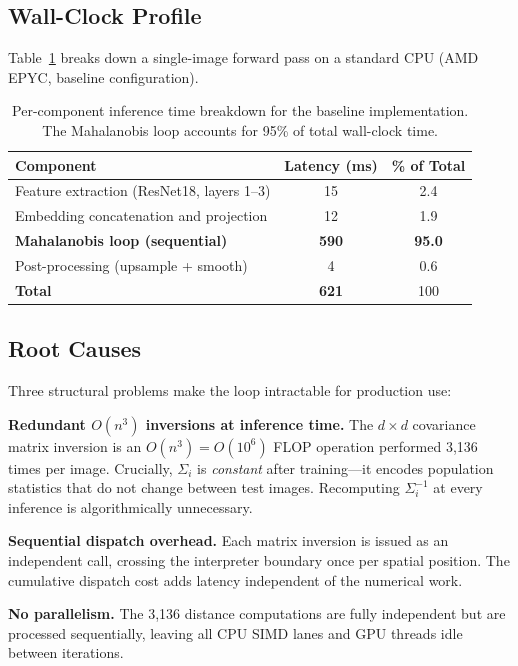 \documentclass[blind]{gtac}
\begin{document}
\subsection{Wall-Clock Profile}

Table~\ref{tab:profile} breaks down a single-image forward pass on a standard
CPU (AMD EPYC, baseline configuration).

\begin{table}[H]
\centering
\caption{Per-component inference time breakdown for the baseline implementation.
The Mahalanobis loop accounts for 95\% of total wall-clock time.}
\label{tab:profile}
\footnotesize
\begin{tabular}{@{}lcc@{}}
\toprule
Component & Latency (ms) & \% of Total \\
\midrule
Feature extraction (ResNet18, layers 1--3) & 15  & 2.4  \\
Embedding concatenation and projection     & 12  & 1.9  \\
\textbf{Mahalanobis loop (sequential)}     & \textbf{590} & \textbf{95.0} \\
Post-processing (upsample + smooth)        &  4  & 0.6  \\
\midrule
\textbf{Total}                             & \textbf{621} & 100  \\
\bottomrule
\end{tabular}
\end{table}

\subsection{Root Causes}

Three structural problems make the loop intractable for production use:

\textbf{Redundant $O(n^3)$ inversions at inference time.}  The
$d\!\times\!d$ covariance matrix inversion is an $O(n^3)\!=\!O(10^6)$
FLOP operation performed 3{,}136 times per image.  Crucially, $\Sigma_i$ is
\emph{constant} after training---it encodes population statistics that do not
change between test images.  Recomputing $\Sigma_i^{-1}$ at every inference is
algorithmically unnecessary.

\textbf{Sequential dispatch overhead.}  Each matrix inversion is issued as an
independent call, crossing the interpreter boundary once per spatial position.
The cumulative dispatch cost adds latency independent of the numerical work.

\textbf{No parallelism.}  The 3{,}136 distance computations are fully
independent but are processed sequentially, leaving all CPU SIMD lanes and GPU
threads idle between iterations.
\end{document}
